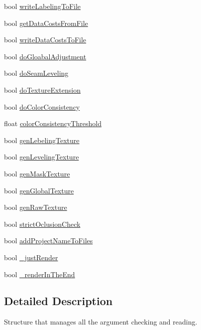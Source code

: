 \begin{DoxyCompactItemize}
\item 
bool \hyperlink{struct_arguments_ac81dde9796306362b5c06f2d62a901ea}{write\+Labeling\+To\+File}
\item 
bool \hyperlink{struct_arguments_a36e514162f0dca494ae8b558016fba23}{get\+Data\+Costs\+From\+File}
\item 
bool \hyperlink{struct_arguments_a3f797aec500d79580f523addf2a62786}{write\+Data\+Costs\+To\+File}
\item 
bool \hyperlink{struct_arguments_a35c85467eaefb45dd9c5573c5697d0be}{do\+Gloabal\+Adjustment}
\item 
bool \hyperlink{struct_arguments_a37157aeefb4bab06270e0787c0bac2cb}{do\+Seam\+Leveling}
\item 
bool \hyperlink{struct_arguments_aa8074aacbc6ee3f99effd5b7613905e5}{do\+Texture\+Extension}
\item 
bool \hyperlink{struct_arguments_aba3898efc576d5bd85f4f89e7b0b79a6}{do\+Color\+Consistency}
\item 
float \hyperlink{struct_arguments_a427521a6262f69340de5f09fdb3292d0}{color\+Consistency\+Threshold}
\item 
bool \hyperlink{struct_arguments_a50abe906778cd4d167400327224437aa}{gen\+Lebeling\+Texture}
\item 
bool \hyperlink{struct_arguments_a3cb31e33468d5ac33e53a155da84b3d2}{gen\+Leveling\+Texture}
\item 
bool \hyperlink{struct_arguments_acada25027fb72d5a7d8440b62653af2f}{gen\+Mask\+Texture}
\item 
bool \hyperlink{struct_arguments_ac401fe9a04307aa31bda75d4424ceed3}{gen\+Global\+Texture}
\item 
bool \hyperlink{struct_arguments_afe5ecd92c78f3f5a6b751139ec50ee6f}{gen\+Raw\+Texture}
\item 
bool \hyperlink{struct_arguments_ab0a6f926571b9ebd895f84af4214880b}{strict\+Oclusion\+Check}
\item 
bool \hyperlink{struct_arguments_a5438dd5f419d88e72ba7dad3e7343229}{add\+Project\+Name\+To\+Files}
\item 
bool \hyperlink{struct_arguments_a425be50cc8828826b939677321ae98dc}{\+\_\+just\+Render}
\item 
bool \hyperlink{struct_arguments_ada75eb1bead23d95007b7a757050015e}{\+\_\+render\+In\+The\+End}
\end{DoxyCompactItemize}


\subsection{Detailed Description}
Structure that manages all the argument checking and reading. 

